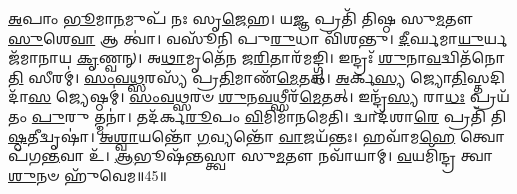 \-\ul{𑌅}\-𑌪𑌾𑌂 \ul{𑌭𑍂}\-𑌮𑌾\-\ul{𑌨}\-𑌮𑍁𑌪᳴ 𑌨𑌃 𑌸𑍃\-\ul{𑌜𑍇}\-𑌹।
𑌯\-\ul{𑌜𑍍𑌞} 𑌪𑍍𑌰𑌤𑌿᳴ 𑌤𑌿𑌷𑍍𑌠 𑌸𑍁\-\ul{𑌮}\-𑌤𑍗 \ul{𑌸𑍁}\-𑌶𑍇\-\ul{𑌵𑌾} 𑌆 𑌤𑍍𑌵𑌾॑।
𑌵𑌸𑍂᳴𑌨𑌿 𑌪𑍁\-\ul{𑌰𑍁}\-𑌧𑌾 𑌵𑌿᳴𑌶𑌨𑍍𑌤𑍁।
\-\ul{𑌦𑍀}\-𑌰𑍍𑌘𑌮𑌾\-\ul{𑌯𑍁}\-𑌰𑍍𑌯𑌜᳴𑌮𑌾𑌨𑌾𑌯 \ul{𑌕𑍃}\-𑌣𑍍𑌵𑌨𑍍।
𑌅\-\ul{𑌥𑌾}\-𑌮𑍃𑌤𑍇᳴𑌨 𑌜\-\ul{𑌰𑌿}\-𑌤𑌾𑌰᳴𑌮𑌙𑍍𑌗𑍍𑌧𑌿।
𑌇𑌨𑍍𑌦𑍍𑌰𑌃᳴ \ul{𑌶𑍁}\-𑌨𑌾\-\ul{𑌵}\-𑌦𑍍𑌵𑌿𑌤᳴𑌨𑍋\-\ul{𑌤𑌿} 𑌸𑍀𑌰𑌮𑍍॑।
\-\ul{𑌸𑌂}\-\-\ul{𑌵}\-\-\ul{𑌥𑍍𑌸}\-𑌰𑌸𑍍𑌯᳴ 𑌪𑍍𑌰\-\ul{𑌤𑌿}\-𑌮𑌾𑌣᳴\-\ul{𑌮𑍇}\-𑌤𑌤𑍍।
\-\ul{𑌅}\-𑌰𑍍𑌕\-\ul{𑌸𑍍𑌯} 𑌜𑍍𑌯𑍋\-\ul{𑌤𑌿}\-𑌸𑍍𑌤𑌦𑌿𑌦𑌾᳴\-\ul{𑌸} 𑌜𑍍𑌯𑍇𑌷𑍍𑌠𑌮𑍍॑।
\-\ul{𑌸𑌂}\-\-\ul{𑌵}\-\-\ul{𑌥𑍍𑌸}\-𑌰𑍞 \ul{𑌶𑍁}\-𑌨\-\ul{𑌵}\-𑌥𑍍𑌸𑍀𑌰᳴\-\ul{𑌮𑍇}\-𑌤𑌤𑍍।
𑌇𑌨𑍍𑌦𑍍𑌰᳴\-\ul{𑌸𑍍𑌯} 𑌰𑌾\-\ul{𑌧𑌃} 𑌪𑍍𑌰𑌯᳴𑌤𑌂 \ul{𑌪𑍁}\-𑌰𑍁 𑌤𑍍𑌮𑌨𑌾॑।
𑌤𑌦᳴𑌰𑍍𑌕\-\ul{𑌰𑍂}\-𑌪𑌂 \ul{𑌵𑌿}\-𑌮𑌿𑌮𑌾᳴𑌨𑌮𑍇𑌤𑌿।
𑌦𑍍𑌵𑌾𑌦᳴𑌶𑌾\-\ul{𑌰𑍇} 𑌪𑍍𑌰𑌤𑌿᳴ 𑌤𑌿\-\ul{𑌷𑍍𑌠}\-𑌤𑍀𑌦𑍍𑌵𑍃𑌷𑌾॑।
\-\ul{𑌅}\-\-\ul{𑌶𑍍𑌵𑌾}\-𑌯𑌨𑍍𑌤𑍋᳴ \ul{𑌗}\-𑌵𑍍𑌯𑌨𑍍𑌤𑍋᳴ \ul{𑌵𑌾}\-𑌜𑌯᳴𑌨𑍍𑌤𑌃।
𑌹𑌵𑌾᳴𑌮\-\ul{𑌹𑍇} 𑌤𑍍𑌵𑍋𑌪᳴𑌗\-\ul{𑌨𑍍𑌤}\-𑌵𑌾 𑌉᳴।
\-\ul{𑌆}\-𑌭𑍂𑌷᳴𑌨𑍍𑌤𑌸𑍍𑌤𑍍𑌵𑌾 𑌸𑍁\-\ul{𑌮}\-𑌤𑍗 𑌨𑌵𑌾᳴𑌯𑌾𑌮𑍍।
\-\ul{𑌵}\-𑌯𑌮𑌿᳴𑌨𑍍𑌦𑍍𑌰 𑌤𑍍𑌵𑌾 \ul{𑌶𑍁}\-𑌨𑍞 𑌹𑍁᳴𑌵𑍇𑌮॥45॥




